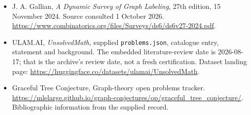 \documentclass[11pt,a4paper]{article}
\begin{document}
{\small

\begin{itemize}
\item[E1] J. A. Gallian, \emph{A Dynamic Survey of Graph Labeling}, 27th edition, 15 November 2024. Source consulted 1 October 2026. \url{https://www.combinatorics.org/files/Surveys/ds6/ds6v27-2024.pdf}.


\item[\hypertarget{source:statement:1}{S1}] ULAM.AI, \emph{UnsolvedMath}, supplied \texttt{problems.json}, catalogue entry, statement and background. The embedded literature-review date is 2026-08-17; that is the archive’s review date, not a fresh certification. Dataset landing page: \url{https://huggingface.co/datasets/ulamai/UnsolvedMath}.

\item[\hypertarget{source:statement:2}{S2}] Graceful Tree Conjecture, Graph-theory open problems tracker. \url{https://mlelarge.github.io/graph-conjectures/op/graceful_tree_conjecture/}. Bibliographic information from the supplied record.

\end{itemize}

}

\label{end:statement}
\end{document}
